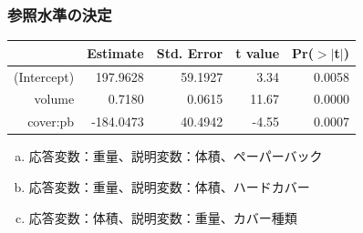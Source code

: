 \begin{frame}
\frametitle{参照水準の決定}


{\small
\begin{center}
\begin{tabular}{rrrrr}
  \hline
 & Estimate & Std. Error & t value & Pr($>$$|$t$|$) \\
  \hline
(Intercept) & 197.9628 & 59.1927 & 3.34 & 0.0058 \\
  volume & 0.7180 & 0.0615 & 11.67 & 0.0000 \\
  cover:pb & -184.0473 & 40.4942 & -4.55 & 0.0007 \\
   \hline
\end{tabular}
\end{center}
}

\begin{enumerate}[(a)]
\item 応答変数：重量、説明変数：体積、ペーパーバック
\item 応答変数：重量、説明変数：体積、ハードカバー
\item 応答変数：体積、説明変数：重量、カバー種類
\end{enumerate}

\end{frame}


